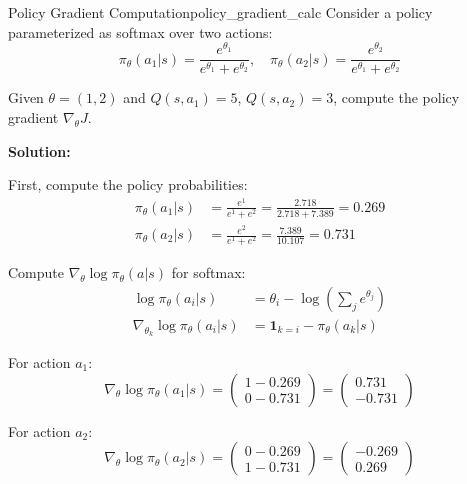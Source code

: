 \begin{example}{Policy Gradient Computation}{policy_gradient_calc}
Consider a policy parameterized as softmax over two actions:
\begin{equation}
\pi_\theta(a_1|s) = \frac{e^{\theta_1}}{e^{\theta_1} + e^{\theta_2}}, \quad \pi_\theta(a_2|s) = \frac{e^{\theta_2}}{e^{\theta_1} + e^{\theta_2}}
\end{equation}

Given $\theta = (1, 2)$ and $Q(s, a_1) = 5$, $Q(s, a_2) = 3$, compute the policy gradient $\nabla_\theta J$.

\tcblower
\textbf{Solution:}

First, compute the policy probabilities:
\begin{align}
\pi_\theta(a_1|s) &= \frac{e^1}{e^1 + e^2} = \frac{2.718}{2.718 + 7.389} = 0.269 \\
\pi_\theta(a_2|s) &= \frac{e^2}{e^1 + e^2} = \frac{7.389}{10.107} = 0.731
\end{align}

Compute $\nabla_\theta \log \pi_\theta(a|s)$ for softmax:
\begin{align}
\log \pi_\theta(a_i|s) &= \theta_i - \log\left(\sum_j e^{\theta_j}\right) \\
\nabla_{\theta_k} \log \pi_\theta(a_i|s) &= \mathbf{1}_{k=i} - \pi_\theta(a_k|s)
\end{align}

For action $a_1$:
\begin{equation}
\nabla_\theta \log \pi_\theta(a_1|s) = \begin{pmatrix} 1 - 0.269 \\ 0 - 0.731 \end{pmatrix} = \begin{pmatrix} 0.731 \\ -0.731 \end{pmatrix}
\end{equation}

For action $a_2$:
\begin{equation}
\nabla_\theta \log \pi_\theta(a_2|s) = \begin{pmatrix} 0 - 0.269 \\ 1 - 0.731 \end{pmatrix} = \begin{pmatrix} -0.269 \\ 0.269 \end{pmatrix}
\end{equation}


\end{example}
